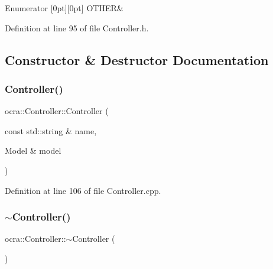 \begin{DoxyEnumFields}{Enumerator}
[0pt][0pt]{}\hypertarget{classocra_1_1Controller_abeaf3673abe2da79493638dcc49fcf6ea2a5f1f9e553eccf1b3f1a26c5979c0ef}{}\label{classocra_1_1Controller_abeaf3673abe2da79493638dcc49fcf6ea2a5f1f9e553eccf1b3f1a26c5979c0ef} 
O\+T\+H\+ER&\\
\hline

\end{DoxyEnumFields}


Definition at line 95 of file Controller.\+h.



\subsection{Constructor \& Destructor Documentation}
\hypertarget{classocra_1_1Controller_a9f72394baa089119cf0b60e3c7160283}{}\label{classocra_1_1Controller_a9f72394baa089119cf0b60e3c7160283} 
\subsubsection{\texorpdfstring{Controller()}{Controller()}}
{\footnotesize\ttfamily ocra\+::\+Controller\+::\+Controller (\begin{DoxyParamCaption}\item[{const std\+::string \&}]{name,  }\item[{Model \&}]{model }\end{DoxyParamCaption})\hspace{0.3cm}{\ttfamily [protected]}}



Definition at line 106 of file Controller.\+cpp.

\hypertarget{classocra_1_1Controller_a42bee636760563a73321de01ba972b6b}{}\label{classocra_1_1Controller_a42bee636760563a73321de01ba972b6b} 
\subsubsection{\texorpdfstring{$\sim$\+Controller()}{~Controller()}}
{\footnotesize\ttfamily ocra\+::\+Controller\+::$\sim$\+Controller (\begin{DoxyParamCaption}{ }\end{DoxyParamCaption})\hspace{0.3cm}{\ttfamily [pure virtual]}}



